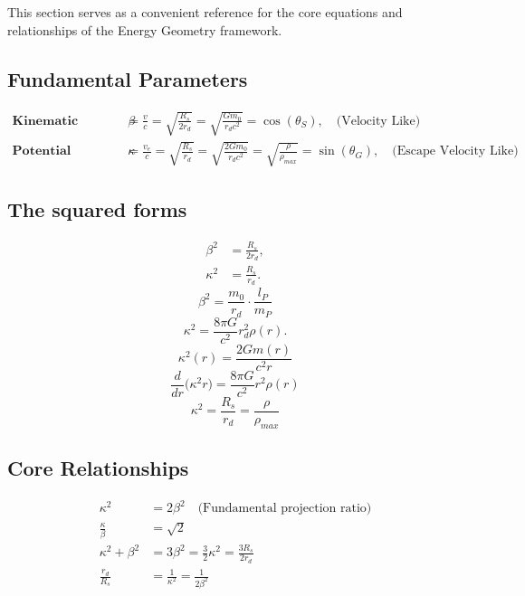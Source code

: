 \documentclass{article}
\begin{document}
This section serves as a convenient reference for the core equations and relationships of the Energy Geometry framework.

\subsection{Fundamental Parameters}

\begin{align}
   \textbf{Kinematic projection} \quad  \beta &=  \frac{v}{c} = \sqrt{\frac{R_s}{2r_{d}}} = \sqrt{\frac{Gm_0}{r_{d}c^2}} = \cos\left(\theta_S\right), \quad \text{(Velocity Like)} \\
 \textbf{Potential projection} \quad  \kappa &= \frac{v_e}{c} = \sqrt{\frac{R_s}{r_{d}}} = \sqrt{\frac{2Gm_0}{r_{d}c^2}} = \sqrt{\frac{\rho}{\rho_{max}}}= \sin\left(\theta_G\right),\quad \text{(Escape Velocity Like)}
\end{align}

\subsection{The squared forms}

\begin{align}
    \beta^2 &= \frac{R_s}{2r_{d}}, \\
    \kappa^2 &= \frac{R_s}{r_{d}}.
\end{align}\[

 \beta^2=\frac{m_0}{r_{d}} \cdot \frac{l_P}{m_P} 
\]
\begin{equation}
\kappa^2 = \frac{8\pi G}{c^2} r_{d}^2 \rho(r).
\end{equation}
\[
\kappa^{2}(r)=\dfrac{2G m(r)}{c^{2} r}
\]
\[
\dfrac{d}{dr}\!\bigl(\kappa^{2}r\bigr)=\dfrac{8\pi G}{c^{2}}r^{2}\rho(r)
\]
\[
\boxed{
\kappa^2=\frac{R_s}{r_{d}} = \frac{\rho}{\rho_{max} }
}
\]

\subsection{Core Relationships}

\begin{align}
    \kappa^2 &= 2\beta^2 \quad \text{(Fundamental projection ratio)} \\
    \frac{\kappa}{\beta} &= \sqrt{2} \\
    \kappa^2 + \beta^2 &= 3\beta^2 = \frac{3}{2}\kappa^2 = \frac{3R_s}{2r_{d}} \\
    \frac{r_{d}}{R_s} &= \frac{1}{\kappa^2} = \frac{1}{2\beta^2}
\end{align}
\end{document}
